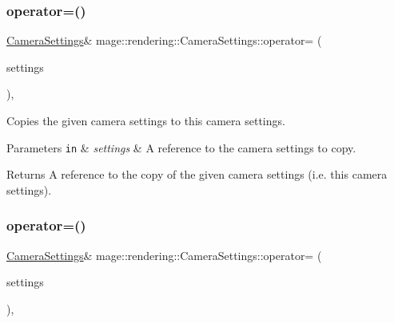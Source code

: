 \subsubsection{\texorpdfstring{operator=()}{operator=()}\hspace{0.1cm}{\footnotesize\ttfamily [1/2]}}
{\footnotesize\ttfamily \hyperlink{classmage_1_1rendering_1_1_camera_settings}{Camera\+Settings}\& mage\+::rendering\+::\+Camera\+Settings\+::operator= (\begin{DoxyParamCaption}\item[{const \hyperlink{classmage_1_1rendering_1_1_camera_settings}{Camera\+Settings} \&}]{settings }\end{DoxyParamCaption})\hspace{0.3cm}{\ttfamily [default]}, {\ttfamily [noexcept]}}

Copies the given camera settings to this camera settings.


\begin{DoxyParams}[1]{Parameters}
\mbox{\tt in}  & {\em settings} & A reference to the camera settings to copy. \\
\hline
\end{DoxyParams}
\begin{DoxyReturn}{Returns}
A reference to the copy of the given camera settings (i.\+e. this camera settings). 
\end{DoxyReturn}
\hypertarget{classmage_1_1rendering_1_1_camera_settings_a28ae670d467adfc74ef8929f24b2e615}{}\label{classmage_1_1rendering_1_1_camera_settings_a28ae670d467adfc74ef8929f24b2e615} 
\subsubsection{\texorpdfstring{operator=()}{operator=()}\hspace{0.1cm}{\footnotesize\ttfamily [2/2]}}
{\footnotesize\ttfamily \hyperlink{classmage_1_1rendering_1_1_camera_settings}{Camera\+Settings}\& mage\+::rendering\+::\+Camera\+Settings\+::operator= (\begin{DoxyParamCaption}\item[{\hyperlink{classmage_1_1rendering_1_1_camera_settings}{Camera\+Settings} \&\&}]{settings }\end{DoxyParamCaption})\hspace{0.3cm}{\ttfamily [default]}, {\ttfamily [noexcept]}}

